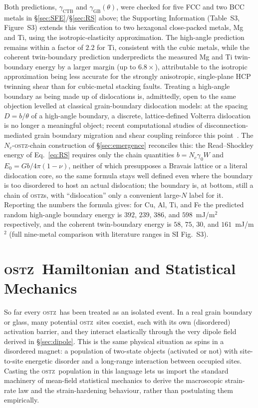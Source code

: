 \documentclass[3p]{elsarticle}
\newcommand{\OSTZ}{\textsc{ostz}}
\newcommand{\gz}{\gamma_0}
\begin{document}
Both predictions, $\gamma_\text{CTB}$ and $\gamma_\text{GB}(\theta)$,
were checked for five FCC and two BCC metals in
\S\ref{sec:SFE}/\S\ref{sec:RS} above; the Supporting Information
(Table~S3, Figure~S3) extends this verification to two hexagonal close-packed
metals, Mg and Ti, using the isotropic-elasticity approximation.
The high-angle prediction remains within a factor of $2.2$ for Ti,
consistent with the cubic metals, while the coherent twin-boundary
prediction underpredicts the measured Mg and Ti twin-boundary energy
by a larger margin (up to $6.8\times$), attributable to the
isotropic approximation being less accurate for the strongly
anisotropic, single-plane HCP twinning shear than for cubic-metal
stacking faults. Treating a high-angle boundary as being made up of
dislocations is, admittedly, open to the same objection levelled at
classical grain-boundary dislocation models: at the spacing
$D=b/\theta$ of a high-angle boundary, a discrete, lattice-defined
Volterra dislocation is no longer a meaningful object; recent
computational studies of disconnection-mediated grain boundary
migration and shear coupling reinforce this
point~\citep{dang2025gb}. The
$N_c$-\OSTZ-chain construction of \S\ref{sec:emergence} reconciles
this: the Read--Shockley energy of Eq.~\eqref{eq:RS} requires only
the chain quantities $b=N_c\gz W$ and $E_0=Gb/4\pi(1-\nu)$, neither of
which presupposes a Bravais lattice or a literal dislocation core, so
the same formula stays well defined even where the boundary is too
disordered to host an actual dislocation; the boundary is, at bottom,
still a chain of \OSTZ s, with ``dislocation'' only a convenient
large-$N$ label for it. Reporting the numbers the formula gives: for
Cu, Al, Ti, and Fe the predicted random high-angle boundary energy is
$392$, $239$, $386$, and $598$~mJ/m$^2$ respectively, and the coherent
twin-boundary energy is $58$, $75$, $30$, and $161$~mJ/m$^2$
(full nine-metal comparison with literature ranges in SI Fig.~S3).

\section{\OSTZ\ Hamiltonian and Statistical Mechanics}
\label{sec:stat}

So far every \OSTZ\ has been treated as an isolated event. In a real
grain boundary or glass, many potential \OSTZ\ sites coexist, each
with its own (disordered) activation barrier, and they interact
elastically through the very dipole field derived in
\S\ref{sec:dipole}. This is the same physical situation as spins in
a disordered magnet: a population of two-state objects (activated or
not) with site-to-site energetic disorder and a long-range
interaction between occupied sites. Casting the \OSTZ\ population in
this language lets us import the standard machinery of mean-field
statistical mechanics to derive the macroscopic strain-rate law and
the strain-hardening behaviour, rather than postulating them
empirically.
\end{document}
